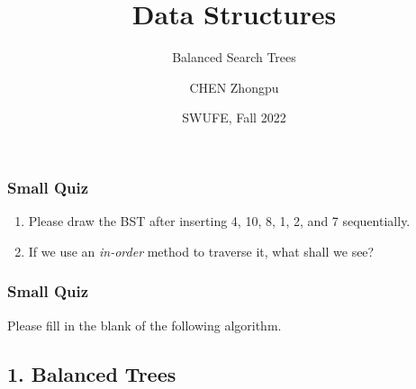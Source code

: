 \documentclass[aspectratio=169, 14pt]{beamer}
\title[Data Structures] %
{Data Structures}
\subtitle{Balanced Search Trees}
\author[CHEN Zhongpu] %
{CHEN Zhongpu}
\institute[] %
{
  School of Computing and Artificial Intelligence \\
  \href{mailto:zpchen@swufe.edu.cn}{zpchen@swufe.edu.cn}
}
\date[] %
{SWUFE, Fall 2022}
\begin{document}
\frame{\titlepage}

\begin{frame}
    \frametitle{Small Quiz}
\begin{enumerate}
    \item Please draw the BST after inserting 4, 10, 8, 1, 2, and 7 sequentially.
    \item If we use an \emph{in-order} method to traverse it, what shall we see?
\end{enumerate}   

\end{frame}

\begin{frame}
    \frametitle{Small Quiz}

Please fill in the blank of the following algorithm.

    

\end{frame}

{
    \begin{frame}
        \section{\textcolor{darkmidnightblue}{1. Balanced Trees}}
    \end{frame}

}
\end{document}
